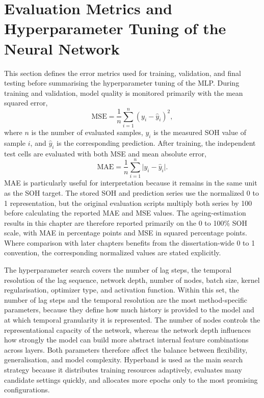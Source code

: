 \documentclass[
    a4paper,
    12pt,
    titlepage,
    bibliography=totoc,
    twoside=on,
    parskip=false,
    numbers=noenddot,
    cleardoublepage=empty,
    DIV=12,
    BCOR=12.0mm,
    headheight=36pt,
    headings=openright
]{scrreprt}
\begin{document}
\section{Evaluation Metrics and Hyperparameter Tuning of the Neural Network}
This section defines the error metrics used for training, validation, and final testing before summarising the hyperparameter tuning of the MLP. During training and validation, model quality is monitored primarily with the mean squared error,
\begin{equation}
\mathrm{MSE} = \frac{1}{n} \sum_{i=1}^{n}(y_i - \hat{y}_i)^2 ,
\end{equation}
where $n$ is the number of evaluated samples, $y_i$ is the measured SOH value of sample $i$, and $\hat{y}_i$ is the corresponding prediction. After training, the independent test cells are evaluated with both MSE and mean absolute error,
\begin{equation}
\mathrm{MAE} = \frac{1}{n} \sum_{i=1}^{n} \lvert y_i - \hat{y}_i \rvert .
\end{equation}
MAE is particularly useful for interpretation because it remains in the same unit as the SOH target. The stored SOH and prediction series use the normalized 0 to 1 representation, but the original evaluation scripts multiply both series by 100 before calculating the reported MAE and MSE values. The ageing-estimation results in this chapter are therefore reported primarily on the 0 to 100\% SOH scale, with MAE in percentage points and MSE in squared percentage points. Where comparison with later chapters benefits from the dissertation-wide 0 to 1 convention, the corresponding normalized values are stated explicitly.

The hyperparameter search covers the number of lag steps, the temporal resolution of the lag sequence, network depth, number of nodes, batch size, kernel regularisation, optimizer type, and activation function. Within this set, the number of lag steps and the temporal resolution are the most method-specific parameters, because they define how much history is provided to the model and at which temporal granularity it is represented. The number of nodes controls the representational capacity of the network, whereas the network depth influences how strongly the model can build more abstract internal feature combinations across layers. Both parameters therefore affect the balance between flexibility, generalisation, and model complexity. Hyperband is used as the main search strategy because it distributes training resources adaptively, evaluates many candidate settings quickly, and allocates more epochs only to the most promising configurations.\autocite{liHyperbandNovelBanditBased2016}
\end{document}
